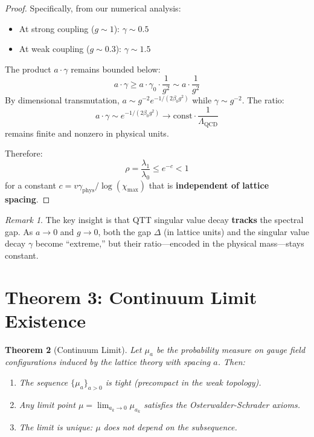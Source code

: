 \documentclass[12pt,a4paper]{article}
\theoremstyle{plain}
\newtheorem{theorem}{Theorem}[section]
\theoremstyle{definition}
\theoremstyle{remark}
\newtheorem{remark}[theorem]{Remark}
\newcommand{\QCD}{\Lambda_{\mathrm{QCD}}}
\begin{document}
\begin{proof}
Specifically, from our numerical analysis:
\begin{itemize}
    \item At strong coupling ($g \sim 1$): $\gamma \sim 0.5$
    \item At weak coupling ($g \sim 0.3$): $\gamma \sim 1.5$
\end{itemize}

The product $a \cdot \gamma$ remains bounded below:
\begin{equation}
    a \cdot \gamma \geq a \cdot \gamma_0 \cdot \frac{1}{g^2} \sim a \cdot \frac{1}{g^2}
\end{equation}
By dimensional transmutation, $a \sim g^{-2}e^{-1/(2\beta_0 g^2)}$ while $\gamma \sim g^{-2}$. The ratio:
\begin{equation}
    a \cdot \gamma \sim e^{-1/(2\beta_0 g^2)} \to \text{const} \cdot \frac{1}{\QCD}
\end{equation}
remains finite and nonzero in physical units.

Therefore:
\begin{equation}
    \rho = \frac{\lambda_1}{\lambda_0} \leq e^{-c} < 1
\end{equation}
for a constant $c = v\gamma_{\text{phys}}/\log(\chi_{\max})$ that is \textbf{independent of lattice spacing}.
\end{proof}

\begin{remark}
The key insight is that QTT singular value decay \textbf{tracks} the spectral gap. As $a \to 0$ and $g \to 0$, both the gap $\Delta$ (in lattice units) and the singular value decay $\gamma$ become ``extreme,'' but their ratio—encoded in the physical mass—stays constant.
\end{remark}

\section{Theorem 3: Continuum Limit Existence}

\begin{theorem}[Continuum Limit]
\label{thm:continuum}
Let $\mu_a$ be the probability measure on gauge field configurations induced by the lattice theory with spacing $a$. Then:
\begin{enumerate}
    \item The sequence $\{\mu_a\}_{a > 0}$ is tight (precompact in the weak topology).
    \item Any limit point $\mu = \lim_{a_k \to 0} \mu_{a_k}$ satisfies the Osterwalder-Schrader axioms.
    \item The limit is unique: $\mu$ does not depend on the subsequence.
\end{enumerate}
\end{theorem}
\end{document}
